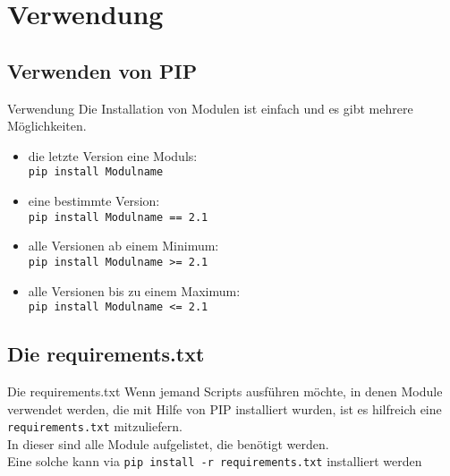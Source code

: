 \section{Verwendung}
\subsection{Verwenden von PIP}
\begin{frame}{Verwendung}
	Die Installation von Modulen ist einfach und es gibt mehrere Möglichkeiten.
	\begin{itemize}
		\item die letzte Version eine Moduls:\\
		\noindent\hspace*{.5cm} \texttt{pip install Modulname}
		\item eine bestimmte Version:\\
		\noindent\hspace*{.5cm} \texttt{pip install Modulname == 2.1}
		\item alle Versionen ab einem Minimum:\\
		\noindent\hspace*{.5cm} \texttt{pip install Modulname >= 2.1}
		\item alle Versionen bis zu einem Maximum:\\ 
		\noindent\hspace*{.5cm} \texttt{pip install Modulname <= 2.1}
	\end{itemize}
\end{frame}

\subsection{Die requirements.txt}
\begin{frame}{Die requirements.txt}
	Wenn jemand Scripts ausführen möchte, in denen Module verwendet werden, die mit Hilfe von PIP installiert wurden, ist es hilfreich eine \texttt{requirements.txt} mitzuliefern.\\
	In dieser sind alle Module aufgelistet, die benötigt werden.\\[.5cm]
	
	
	Eine solche kann via \texttt{pip install -r requirements.txt} installiert werden
\end{frame}



